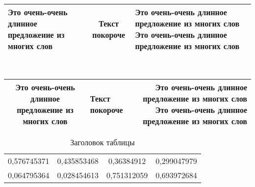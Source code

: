 \begin{tabularx}{\textwidth}{|X|c|X|}
    \hline
    Это очень-очень длинное предложение из многих слов &
    Текст покороче                                     &
    Это очень-очень длинное предложение из многих слов Это очень-очень длинное предложение из многих слов
    \\ \hline
\end{tabularx}
\\

\begin{tabulary}{\textwidth}{|C|J|R|}
    \hline
    Это очень-очень длинное предложение из многих слов &
    Текст покороче &
    Это очень-очень длинное предложение из многих слов Это очень-очень длинное предложение из многих слов
    \\ \hline
\end{tabulary}


\begin{table}[!h]
    \begin{center}
        \caption[Заголовок, который будет в списке таблиц]{Заголовок таблицы}\label{tab:1}
        \begin{tabular}{|c|c|c|c|}
            \hline
            0,576745371 & 0,435853468 & 0,36384912  & 0,299047979 \\
            0,064795364 & 0,028454613 & 0,751312059 & 0,693972684 \\
            \hline
        \end{tabular}
    \end{center}
\end{table}


